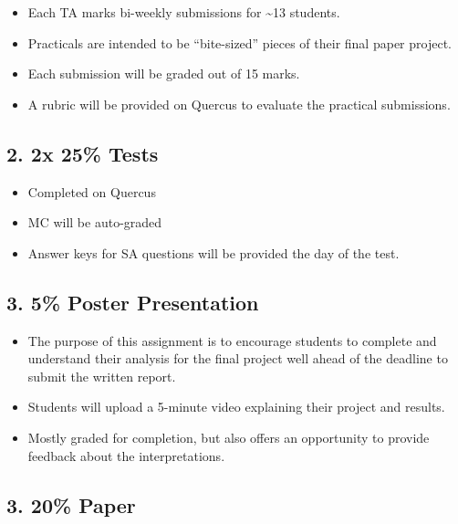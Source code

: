 \documentclass[
]{book}
\providecommand{\tightlist}{%
  \setlength{\itemsep}{0pt}\setlength{\parskip}{0pt}}
\begin{document}
\begin{itemize}
\tightlist
\item
  Each TA marks bi-weekly submissions for \textasciitilde13 students.
\item
  Practicals are intended to be ``bite-sized'' pieces of their final paper project.
\item
  Each submission will be graded out of 15 marks.
\item
  A rubric will be provided on Quercus to evaluate the practical submissions.
\end{itemize}

\subsection*{2. 2x 25\% Tests}\label{x-25-tests}

\begin{itemize}
\tightlist
\item
  Completed on Quercus
\item
  MC will be auto-graded
\item
  Answer keys for SA questions will be provided the day of the test.
\end{itemize}

\subsection*{3. 5\% Poster Presentation}\label{poster-presentation}

\begin{itemize}
\tightlist
\item
  The purpose of this assignment is to encourage students to complete and understand their analysis for the final project well ahead of the deadline to submit the written report.
\item
  Students will upload a 5-minute video explaining their project and results.
\item
  Mostly graded for completion, but also offers an opportunity to provide feedback about the interpretations.
\end{itemize}

\subsection*{3. 20\% Paper}\label{paper}
\end{document}
